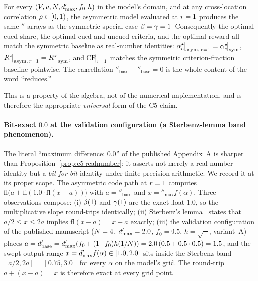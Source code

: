 \begin{proposition}[Real-number recovery at $\Rsens = 1$]
\label{prop:c5-realnumber}
For every $(V, v, N, d'_{\max}, f_0, h)$ in the model's
domain, and at any cross-location correlation $\rho \in [0, 1)$, the
asymmetric model evaluated at $\Rsens = 1$ produces the same
$\dprime$ arrays as the symmetric special case
$\beta = \gamma = 1$. Consequently the optimal cued share, the
optimal cued and uncued criteria, and the optimal reward all match
the symmetric baseline as real-number identities:
$\alpha_c^\star\!\big|_{\mathrm{asym},\,r=1} =
 \alpha_c^\star\!\big|_{\mathrm{sym}}$,
$R^\star\!\big|_{\mathrm{asym},\,r=1} =
 R^\star\!\big|_{\mathrm{sym}}$, and
$\mathrm{CF}\!\big|_{r=1}$ matches the symmetric criterion-fraction
baseline pointwise. The cancellation
$\dprime_{\mathrm{base}} - \dprime_{\mathrm{base}} = 0$ is the whole
content of the word ``reduces.''
\end{proposition}

This is a property of the algebra, not of the numerical
implementation, and is therefore the appropriate \emph{universal}
form of the C5 claim.

\paragraph{Bit-exact $0.0$ at the validation configuration (a
Sterbenz-lemma band phenomenon).}
The literal ``maximum difference: $0.0$'' of the published
Appendix~A is sharper than Proposition~\ref{prop:c5-realnumber}: it
asserts not merely a real-number identity but a \emph{bit-for-bit}
identity under finite-precision arithmetic. We record it at its
proper scope. The asymmetric code path at $\Rsens = 1$ computes
$\mathrm{fl}\big(a + \mathrm{fl}(1.0 \cdot \mathrm{fl}(x - a))\big)$
with $a = \dprime_{\mathrm{base}}$ and
$x = \dprime_{\max} f(\alpha)$. Three observations compose:
(i) $\beta(1)$ and $\gamma(1)$ are the exact float $1.0$, so the
multiplicative slope round-trips identically;
(ii) Sterbenz's lemma~\cite{Sterbenz1974,Goldberg1991} states that
$a/2 \le x \le 2a$ implies $\mathrm{fl}(x - a) = x - a$ exactly;
(iii) the validation configuration of the published manuscript
($N = 4$, $d'_{\max} = 2.0$, $f_0 = 0.5$, $h = \sqrt{\,\cdot\,}$,
variant~A) places
$a = d'_{\mathrm{base}} = d'_{\max}(f_0 + (1{-}f_0) h(1/N))
 = 2.0\,(0.5 + 0.5 \cdot 0.5) = 1.5$,
and the swept output range $x = d'_{\max} f(\alpha) \in [1.0, 2.0]$
sits inside the Sterbenz band $[a/2, 2a] = [0.75, 3.0]$ for every
$\alpha$ on the model's grid. The round-trip
$a + (x - a) = x$ is therefore exact at every grid point.

